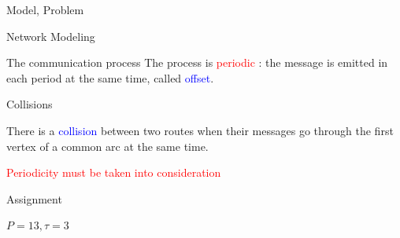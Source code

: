 \documentclass[10 pt]{beamer}
\begin{document}
\begin{section}{Model, Problem}
\begin{subsection}{Network Modeling}
\begin{frame}{The communication process}
   The process is \textcolor{red}{periodic} : the message is emitted in each period at the same time, called \textcolor{blue}{offset}.
   
\end{frame}


 \begin{frame}{Collisions}

\begin{center}
\end{center}
\vspace{1cm}
\centering
There is a \textcolor{blue}{collision} between two routes when their messages go through the first vertex of a common arc at the same time.
\vspace{0.5cm}

 \textcolor{red}{Periodicity must be taken into consideration} 
\end{frame}

 \begin{frame}{Assignment }

 $P=13, \tau = 3$ 
 
\begin{center}
 \begin{multicols}{2}
\end{multicols}
\end{center}
\end{frame}
\end{subsection}
\end{section}
\end{document}
